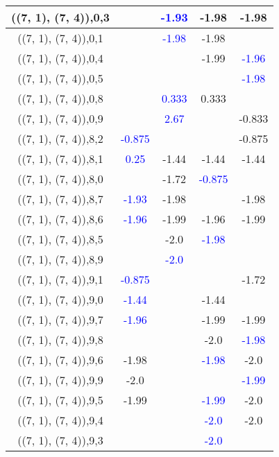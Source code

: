 \documentclass{article}
\begin{document}
\begin{center}
\begin{longtable}{|c|c|c|c|c|}
        	\hline
        	((7, 1), (7, 4)),0,3&& \textcolor{blue}{-1.93}&-1.98&-1.98\\
        	\hline
        	((7, 1), (7, 4)),0,1&& \textcolor{blue}{-1.98}&-1.98&\\
        	\hline
        	((7, 1), (7, 4)),0,4&&&-1.99& \textcolor{blue}{-1.96}\\
        	\hline
        	((7, 1), (7, 4)),0,5&&&& \textcolor{blue}{-1.98}\\
        	\hline
        	((7, 1), (7, 4)),0,8&& \textcolor{blue}{0.333}&0.333&\\
        	\hline
        	((7, 1), (7, 4)),0,9&& \textcolor{blue}{2.67}&&-0.833\\
        	\hline
        	((7, 1), (7, 4)),8,2& \textcolor{blue}{-0.875}&&&-0.875\\
        	\hline
        	((7, 1), (7, 4)),8,1& \textcolor{blue}{0.25}&-1.44&-1.44&-1.44\\
        	\hline
        	((7, 1), (7, 4)),8,0&&-1.72& \textcolor{blue}{-0.875}&\\
        	\hline
        	((7, 1), (7, 4)),8,7& \textcolor{blue}{-1.93}&-1.98&&-1.98\\
        	\hline
        	((7, 1), (7, 4)),8,6& \textcolor{blue}{-1.96}&-1.99&-1.96&-1.99\\
        	\hline
        	((7, 1), (7, 4)),8,5&&-2.0& \textcolor{blue}{-1.98}&\\
        	\hline
        	((7, 1), (7, 4)),8,9&& \textcolor{blue}{-2.0}&&\\
        	\hline
        	((7, 1), (7, 4)),9,1& \textcolor{blue}{-0.875}&&&-1.72\\
        	\hline
        	((7, 1), (7, 4)),9,0& \textcolor{blue}{-1.44}&&-1.44&\\
        	\hline
        	((7, 1), (7, 4)),9,7& \textcolor{blue}{-1.96}&&-1.99&-1.99\\
        	\hline
        	((7, 1), (7, 4)),9,8&&&-2.0& \textcolor{blue}{-1.98}\\
        	\hline
        	((7, 1), (7, 4)),9,6&-1.98&& \textcolor{blue}{-1.98}&-2.0\\
        	\hline
        	((7, 1), (7, 4)),9,9&-2.0&&& \textcolor{blue}{-1.99}\\
        	\hline
        	((7, 1), (7, 4)),9,5&-1.99&& \textcolor{blue}{-1.99}&-2.0\\
        	\hline
        	((7, 1), (7, 4)),9,4&&& \textcolor{blue}{-2.0}&-2.0\\
        	\hline
        	((7, 1), (7, 4)),9,3&&& \textcolor{blue}{-2.0}&\\

\end{longtable}
\end{center}
\end{document}
